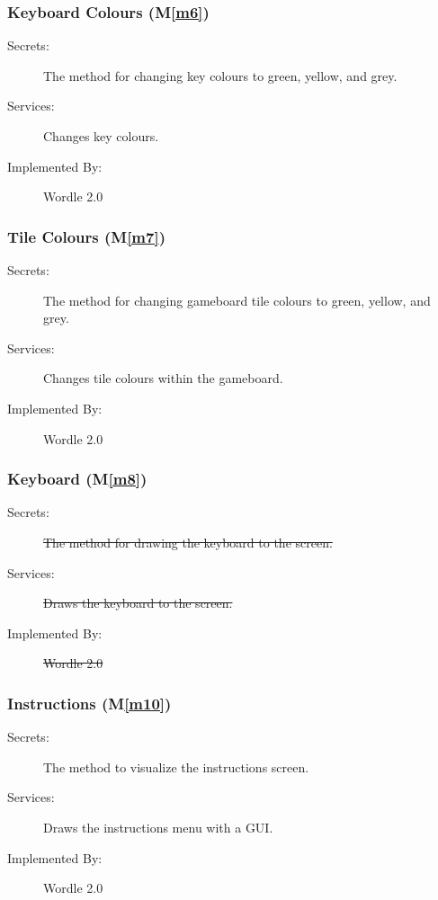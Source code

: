 \documentclass[12pt, titlepage]{article}
\newcommand{\mref}[1]{M\ref{#1}}
\begin{document}
	\subsubsection{Keyboard Colours (\mref{m6})}
	\begin{description}
		\item[Secrets:]The method for changing key colours to green, yellow, and grey.
		\item[Services:]Changes key colours.
		\item[Implemented By:] Wordle 2.0
	\end{description}
	
	\subsubsection{Tile Colours (\mref{m7})}
	\begin{description}
		\item[Secrets:]The method for changing gameboard tile colours to green, yellow, and grey.
		\item[Services:]Changes tile colours within the gameboard.
		\item[Implemented By:] Wordle 2.0
	\end{description}
	
	\subsubsection{Keyboard (\mref{m8})}
	\begin{description}
		\item[Secrets:]\st{The method for drawing the keyboard to the screen.}
		\item[Services:]\st{Draws the keyboard to the screen.}
		\item[Implemented By:] \st{Wordle 2.0}
	\end{description}
	
	\subsubsection{Instructions (\mref{m10})}
	\begin{description}
		\item[Secrets:]The method to visualize the instructions screen.
		\item[Services:]Draws the instructions menu with a GUI.
		\item[Implemented By:] Wordle 2.0
	\end{description}
	
\end{document}
